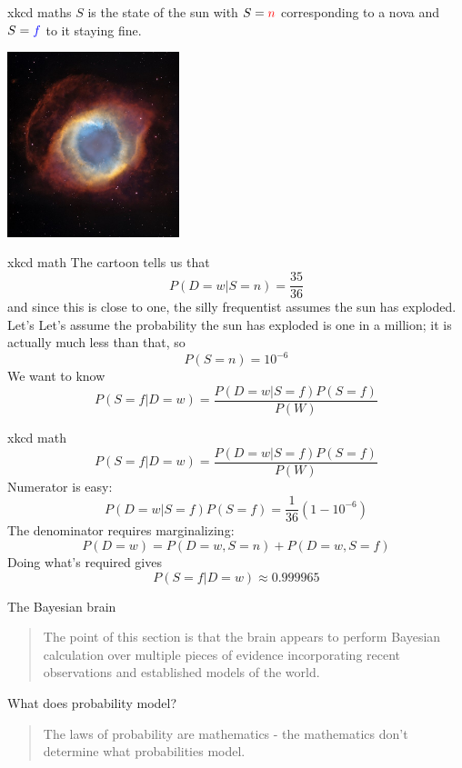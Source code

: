 \documentclass{beamer}
\newcommand{\crish}{\color{reddish}}
\newcommand{\cbla}{\color{black}}
\newcommand{\cred}{\color{red}}
\newcommand{\cblu}{\color{blue}}
\begin{document}
\begin{frame}{xkcd maths}
  \crish$S$\cbla{} is the state of the \color{orange}sun\cbla{} with
  \crish$S=\cred{}n$\cbla{}  corresponding to a \cred{}nova\cbla{} and \crish$S=\cblu{}f$\cbla{} to it staying fine. 
\begin{center}
\includegraphics[width=5cm]{nebula.jpg}
\end{center}
\vfill
{}
\end{frame}

\begin{frame}{xkcd math}
  The cartoon tells us that
  \crish$$
  P(D=w|S=n)=\frac{35}{36}
  $$\cbla{}
and since this is close to one, the silly frequentist assumes the sun
has exploded.\vskip 1cm
Let's  Let's assume the probability the sun has exploded is one
in a million; it is actually much less than that, so
\crish$$
P(S=n)=10^{-6}
$$\cbla{}
We want to know
\crish$$
P(S=f|D=w)=\frac{P(D=w|S=f)P(S=f)}{P(W)}
$$\cbla{}
\end{frame}


\begin{frame}{xkcd math}
\crish$$
P(S=f|D=w)=\frac{P(D=w|S=f)P(S=f)}{P(W)}
$$\cbla{}
Numerator is easy:
\crish$$
P(D=w|S=f)P(S=f)=\frac{1}{36}(1-10^{-6})
$$\cbla{}
The denominator requires marginalizing:
\crish$$
P(D=w)=P(D=w,S=n)+P(D=w,S=f)
$$\cbla{}
\vskip 1cm
Doing what's required gives
\crish$$
P(S=f|D=w)\approx 0.999965
$$\cbla{}
\end{frame}

\begin{frame}{The Bayesian brain}
  \begin{quote}The point of this section is that the brain appears to perform Bayesian calculation over multiple pieces of evidence incorporating recent observations and established models of the world.
  \end{quote}
\end{frame}

\begin{frame}{What does probability model?}
  \begin{quote}
    The laws of probability are mathematics - the mathematics don't determine what probabilities model.
    \end{quote}
\end{frame}
\end{document}
